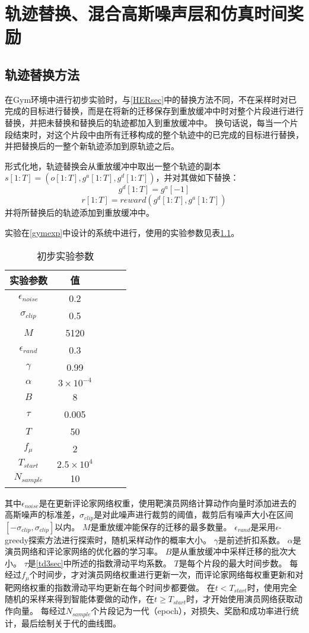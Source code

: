 \chapter{轨迹替换、混合高斯噪声层和仿真时间奖励}
\section{轨迹替换方法}

在Gym环境中进行初步实验时，与\ref{HERsec}中的替换方法不同，不在采样时对已完成的目标进行替换，而是在将新的迁移保存到重放缓冲中时对整个片段进行进行替换，并把未替换和替换后的轨迹都加入到重放缓冲中。
换句话说，每当一个片段结束时，对这个片段中由所有迁移构成的整个轨迹中的已完成的目标进行替换，并把替换后的一整个新轨迹添加到原轨迹之后。

形式化地，轨迹替换会从重放缓冲中取出一整个轨迹的副本$s[1:T]=(o[1:T], g^a[1:T], g^d[1:T])$，并对其做如下替换：
$$g^d[1:T]=g^a[-1]$$
$$r[1:T]=reward(g^d[1:T], g^a[1:T])$$
并将所替换后的轨迹添加到重放缓冲中。

实验在\ref{gymexp}中设计的系统中进行，使用的实验参数见表\ref{pretable}。
    \begin{table}[htbp]
        \caption{初步实验参数}
        \label{pretable}
    \vspace{0.5em}\centering\wuhao
    \begin{tabular}{ccccc}
    \toprule[1.5pt]
    实验参数 & 值\\
    \midrule[1pt]
        $\epsilon_{noise}$ & 0.2\\
        $\sigma_{clip}$ & 0.5\\
        $M$ & 5120\\
        $\epsilon_{rand}$ & 0.3\\
        $\gamma$ & 0.99\\
        $\alpha$ & $3\times 10^{-4}$\\
        $B$ & 8\\
        $\tau$ & 0.005\\
        $T$ & 50\\
        $f_\mu$ & 2\\
        $T_{start}$ & $2.5\times 10^4$\\
        $N_{sample}$ & 10 \\
    \bottomrule[1.5pt]
    \end{tabular}
    \end{table}
    其中$\epsilon_{noise}$是在更新评论家网络权重，使用靶演员网络计算动作向量时添加进去的高斯噪声的标准差，$\sigma_{clip}$是对此噪声进行裁剪的阈值，裁剪后有噪声大小在区间$[-\sigma_{clip},\sigma_{clip}]$以内。
    $M$是重放缓冲能保存的迁移的最多数量。
    $\epsilon_{rand}$是采用$\epsilon$-greedy探索方法进行探索时，随机采样动作的概率大小。
    $\gamma$是前述折扣系数。
    $\alpha$是演员网络和评论家网络的优化器的学习率。
    $B$是从重放缓冲中采样迁移的批次大小。
    $\tau$是\ref{td3sec}中所述的指数滑动平均系数。
    $T$是每个片段的最大时间步数。
    每经过$f_\mu$个时间步，才对演员网络权重进行更新一次，而评论家网络每权重更新和对靶网络权重的指数滑动平均更新在每个时间步都要做。
    在$t<T_{start}$时，使用完全随机的采样来得到智能体要做的动作，在$t\geq T_{start}$时，才开始使用演员网络获取动作向量。
    每经过$N_{sample}$个片段记为一代（epoch），对损失、奖励和成功率进行统计，最后绘制关于代的曲线图。


